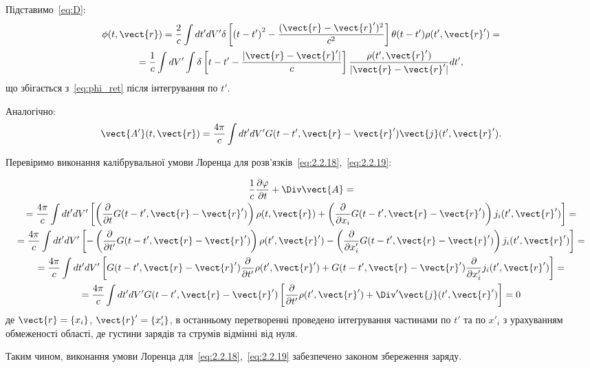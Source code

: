 Підставимо~\eqref{eq:D}:
\begin{multline*}
	\phi (t, \vect{r}) = \frac2c \int dt' dV' \delta \left[ \left( t - t' \right)^2 - \frac{(\vect{r} - \vect{r}')^2}{c^2} \right] \theta (t - t') \rho (t',
	\vect{r}') = \\
	= \frac{1}{c} \int dV' \int \delta \left[ t - t' - \frac{|\vect{r} - \vect{r}'|}{c} \right] \frac{\rho (t', \vect{r}')}{|\vect{r} - \vect{r}'|} dt',
\end{multline*}
що збігається з~\eqref{eq:phi_ret} після інтегрування по $t'$.

Аналогічно:
\begin{equation}\label{eq:2.2.19}
	\vect{A'} (t, \vect{r}) = \frac{4\pi}{c} \int dt' dV' G(t - t', \vect{r} - \vect{r}') \vect{j} (t', \vect{r}').
\end{equation}

Перевіримо виконання калібрувальної умови Лоренца для розв’язків~\eqref{eq:2.2.18},~\eqref{eq:2.2.19}:

\begin{multline*}
\frac{1}{c} \frac{\partial \varphi}{\partial t} + \Div\vect{A} = \\
= \frac{4\pi}{c} \int dt' dV' \left[ \left( \frac{\partial}{\partial t} G(t - t', \vect{r} - \vect{r}') \right) \rho (t, \vect{r}) + \left(
\frac{\partial}{\partial x_i} G(t - t', \vect{r} - \vect{r}') \right) j_i (t', \vect{r}') \right] = \\
= \frac{4\pi}{c} \int dt' dV' \left[ - \left( \frac{\partial}{\partial t'} G(t - t', \vect{r} - \vect{r}') \right) \rho (t', \vect{r}') - \left(
\frac{\partial}{\partial x'_i} G(t - t', \vect{r} - \vect{r}') \right) j_i (t', \vect{r}') \right] = \\
= \frac{4\pi}{c} \int dt' dV' \left[ G(t - t', \vect{r} - \vect{r}') \frac{\partial}{\partial t'} \rho (t', \vect{r}') + G(t - t', \vect{r} -
\vect{r}') \frac{\partial}{\partial x'_i} j_i (t', \vect{r}') \right] = \\
= \frac{4\pi}{c} \int dt' dV' G(t - t', \vect{r} - \vect{r}') \left[ \frac{\partial}{\partial t'} \rho (t', \vect{r}') + \Div'\vect{j}
(t', \vect{r}') \right] = 0
\end{multline*}
де \( \vect{r} = \{ x_i \} \), \( \vect{r}' = \{ x'_i \} \), в останньому перетворенні проведено інтегрування частинами по \( t' \) та по \( x'_i \) з
урахуванням обмеженості області, де густини зарядів та струмів відмінні від нуля.

Таким чином, виконання умови Лоренца для~\eqref{eq:2.2.18},~\eqref{eq:2.2.19} забезпечено законом збереження заряду.

